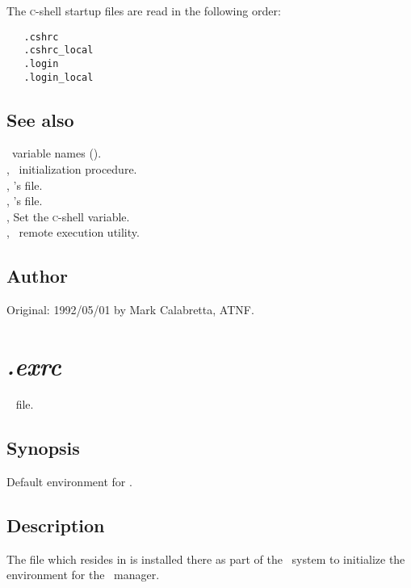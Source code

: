 The \textsc{c}-shell startup files are read in the following order:

\begin{verbatim}
   .cshrc
   .cshrc_local
   .login
   .login_local
\end{verbatim}

\subsection*{See also}

\aipspp\ variable names ().\\
, \aipspp\ initialization procedure.\\
, 's  file.\\
, 's  file.\\
, Set the \textsc{c}-shell  variable.\\
, \aipspp\ remote execution utility.

\subsection*{Author}

Original: 1992/05/01 by Mark Calabretta, ATNF.


\newpage
\section{\textit{.exrc}}
\label{.exrc}

\aipspp\  file.

\subsection*{Synopsis}

\begin{synopsis}
   Default environment for .
\end{synopsis}

\subsection*{Description}

The  file which resides in  is installed there as
part of the \aipspp\ system to initialize the  environment for the
\aipspp\ manager.

